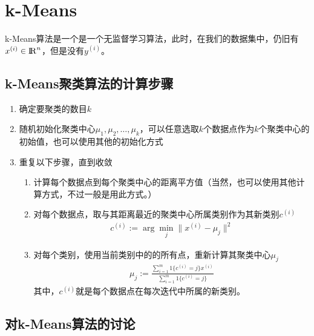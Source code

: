 \section{k-Means}
k-Means算法是一个是一个无监督学习算法，此时，在我们的数据集中，仍旧有$x^{(i)} \in {\rm I\!R}^n$，但是没有$y^{(i)}$。

\subsection{k-Means聚类算法的计算步骤}
\begin{enumerate}
	\item 确定要聚类的数目$k$
	\item 随机初始化聚类中心$\mu_1, \mu_2, \dots, \mu_k$，可以任意选取$k$个数据点作为$k$个聚类中心的初始值，也可以使用其他的初始化方式
	\item 重复以下步骤，直到收敛
	\begin{enumerate}
		\item 计算每个数据点到每个聚类中心的距离平方值（当然，也可以使用其他计算方式，不过一般是用此方式。）
		\item 对每个数据点，取与其距离最近的聚类中心所属类别作为其新类别$c^{(i)}$
		\begin{align}
			c^{(i)} := \arg \min_j \|x^{(i)}-\mu_j\|^2
		\end{align}
		\item 对每个类别，使用当前类别中的的所有点，重新计算其聚类中心$\mu_j$
		\begin{align}
			\mu_j := \frac{\sum_{i=1}^{m}1\{c^{(i)}=j\}x^{(i)}}{\sum_{i=1}^{m}1\{c^{(i)}=j\}}
		\end{align}
		其中，$c^{(i)}$就是每个数据点在每次迭代中所属的新类别。
	\end{enumerate}
\end{enumerate}

\subsection{对k-Means算法的讨论}
